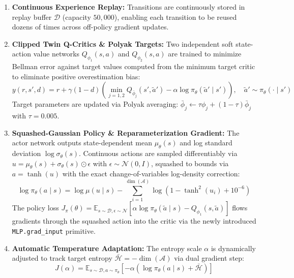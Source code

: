 \documentclass[11pt,a4paper]{article}
\begin{document}
\begin{enumerate}[nosep]
  \item \textbf{Continuous Experience Replay:} Transitions are continuously stored in replay buffer $\mathcal{D}$ (capacity $50,000$), enabling each transition to be reused dozens of times across off-policy gradient updates.
  \item \textbf{Clipped Twin Q-Critics \& Polyak Targets:} Two independent soft state-action value networks $Q_{\phi_1}(s, a)$ and $Q_{\phi_2}(s, a)$ are trained to minimize Bellman error against target values computed from the minimum target critic to eliminate positive overestimation bias:
  \begin{equation}
  y(r, s', d) = r + \gamma (1-d) \left( \min_{j=1,2} Q_{\bar\phi_j}\left(s', \tilde{a}'\right) - \alpha \log \pi_\theta\left(\tilde{a}' \mid s'\right) \right), \quad \tilde{a}' \sim \pi_\theta(\cdot \mid s')
  \end{equation}
  Target parameters are updated via Polyak averaging: $\bar\phi_j \leftarrow \tau \phi_j + (1-\tau)\bar\phi_j$ with $\tau = 0.005$.
  \item \textbf{Squashed-Gaussian Policy \& Reparameterization Gradient:} The actor network outputs state-dependent mean $\mu_\theta(s)$ and log standard deviation $\log \sigma_\theta(s)$. Continuous actions are sampled differentiably via $u = \mu_\theta(s) + \sigma_\theta(s) \odot \epsilon$ with $\epsilon \sim \mathcal{N}(0, I)$, squashed to bounds via $a = \tanh(u)$ with the exact change-of-variables log-density correction:
  \begin{equation}
  \log \pi_\theta(a \mid s) = \log \mu(u \mid s) - \sum_{i=1}^{\dim(\mathcal{A})} \log\left( 1 - \tanh^2(u_i) + 10^{-6} \right)
  \end{equation}
  The policy loss $J_\pi(\theta) = \mathbb{E}_{s\sim\mathcal{D}, \epsilon\sim\mathcal{N}} [\alpha \log \pi_\theta(\tilde{a} \mid s) - Q_{\phi_1}(s, \tilde{a})]$ flows gradients through the squashed action into the critic via the newly introduced \texttt{MLP.grad\_input} primitive.
  \item \textbf{Automatic Temperature Adaptation:} The entropy scale $\alpha$ is dynamically adjusted to track target entropy $\bar{\mathcal{H}} = -\dim(\mathcal{A})$ via dual gradient step:
  \begin{equation}
  J(\alpha) = \mathbb{E}_{s\sim\mathcal{D}, a\sim\pi_\theta} \left[ -\alpha \left( \log \pi_\theta(a \mid s) + \bar{\mathcal{H}} \right) \right]
  \end{equation}
\end{enumerate}
\end{document}
